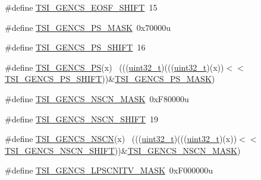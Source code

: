 \begin{DoxyCompactItemize}
\item 
\#define \hyperlink{group___t_s_i___register___masks_ga9a2e8c68bfb60312ebdeea4f069d9086}{T\+S\+I\+\_\+\+G\+E\+N\+C\+S\+\_\+\+E\+O\+S\+F\+\_\+\+S\+H\+I\+FT}~15
\item 
\#define \hyperlink{group___t_s_i___register___masks_ga3c608c250c31872d206e9c18eea97799}{T\+S\+I\+\_\+\+G\+E\+N\+C\+S\+\_\+\+P\+S\+\_\+\+M\+A\+SK}~0x70000u
\item 
\#define \hyperlink{group___t_s_i___register___masks_gaae1f3b081a9c92fefe10bd3ec1f40734}{T\+S\+I\+\_\+\+G\+E\+N\+C\+S\+\_\+\+P\+S\+\_\+\+S\+H\+I\+FT}~16
\item 
\#define \hyperlink{group___t_s_i___register___masks_ga6edb5dbc41896c6d33fd1395d9e1a17d}{T\+S\+I\+\_\+\+G\+E\+N\+C\+S\+\_\+\+PS}(x)                                                ~(((\hyperlink{_p_e___types_8h_a33594304e786b158f3fb30289278f5af}{uint32\+\_\+t})(((\hyperlink{_p_e___types_8h_a33594304e786b158f3fb30289278f5af}{uint32\+\_\+t})(x))$<$$<$\hyperlink{group___t_s_i___register___masks_gaae1f3b081a9c92fefe10bd3ec1f40734}{T\+S\+I\+\_\+\+G\+E\+N\+C\+S\+\_\+\+P\+S\+\_\+\+S\+H\+I\+FT}))\&\hyperlink{group___t_s_i___register___masks_ga3c608c250c31872d206e9c18eea97799}{T\+S\+I\+\_\+\+G\+E\+N\+C\+S\+\_\+\+P\+S\+\_\+\+M\+A\+SK})
\item 
\#define \hyperlink{group___t_s_i___register___masks_ga3a420e0ae200374eca1a185b535cc0ba}{T\+S\+I\+\_\+\+G\+E\+N\+C\+S\+\_\+\+N\+S\+C\+N\+\_\+\+M\+A\+SK}~0x\+F80000u
\item 
\#define \hyperlink{group___t_s_i___register___masks_gab90732bc69449d59a0fc0f3c208caf21}{T\+S\+I\+\_\+\+G\+E\+N\+C\+S\+\_\+\+N\+S\+C\+N\+\_\+\+S\+H\+I\+FT}~19
\item 
\#define \hyperlink{group___t_s_i___register___masks_ga88b69a519adf7824cdb68192fb98b684}{T\+S\+I\+\_\+\+G\+E\+N\+C\+S\+\_\+\+N\+S\+CN}(x)                                            ~(((\hyperlink{_p_e___types_8h_a33594304e786b158f3fb30289278f5af}{uint32\+\_\+t})(((\hyperlink{_p_e___types_8h_a33594304e786b158f3fb30289278f5af}{uint32\+\_\+t})(x))$<$$<$\hyperlink{group___t_s_i___register___masks_gab90732bc69449d59a0fc0f3c208caf21}{T\+S\+I\+\_\+\+G\+E\+N\+C\+S\+\_\+\+N\+S\+C\+N\+\_\+\+S\+H\+I\+FT}))\&\hyperlink{group___t_s_i___register___masks_ga3a420e0ae200374eca1a185b535cc0ba}{T\+S\+I\+\_\+\+G\+E\+N\+C\+S\+\_\+\+N\+S\+C\+N\+\_\+\+M\+A\+SK})
\item 
\#define \hyperlink{group___t_s_i___register___masks_gaf89fb1d534403dbb1be0df6093c0d529}{T\+S\+I\+\_\+\+G\+E\+N\+C\+S\+\_\+\+L\+P\+S\+C\+N\+I\+T\+V\+\_\+\+M\+A\+SK}~0x\+F000000u

\end{DoxyCompactItemize}
